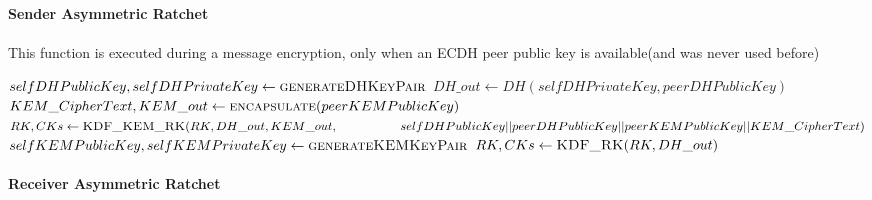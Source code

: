 \documentclass[a4paper,11pt]{article}
\begin{document}
      \paragraph*{Sender Asymmetric Ratchet}
      \paragraph*{}This function is executed during a message encryption, only when an ECDH peer public key is available(and was never used before)
      \begin{algorithmic}
          \Statex
          \State $selfDHPublicKey, selfDHPrivateKey \gets \Call{generateDHKeyPair}{}$
          \Statex
          \State $DH\_out \gets DH(selfDHPrivateKey, peerDHPublicKey)$
          \Statex
          \Statex
            \Statex
            \State $KEM\_CipherText, KEM\_out \gets \Call{encapsulate}{peerKEMPublicKey}$
            \State $RK, CKs \gets \Call{KDF\_KEM\_RK}{RK, DH\_out, KEM\_out,\newline
            \hspace*{5em}selfDHPublicKey || peerDHPublicKey || peerKEMPublicKey || KEM\_CipherText}$
            \Statex
            \Statex
            \Statex
            \State $selfKEMPublicKey, selfKEMPrivateKey \gets \Call{generateKEMKeyPair}{}$
          \Else
            \Statex
            \State $RK, CKs \gets \Call{KDF\_RK}{RK, DH\_out}$
          \EndIf


        \EndFunction
      \end{algorithmic}

      \paragraph*{Receiver Asymmetric Ratchet}
\end{document}
